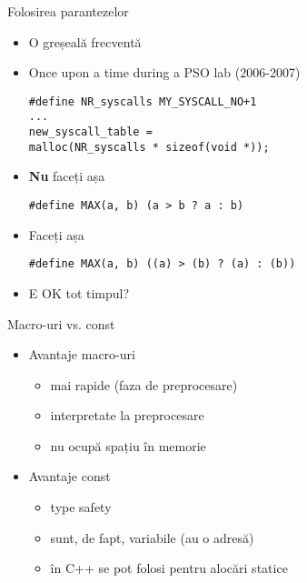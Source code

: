 \documentclass{beamer}
\begin{document}
\begin{frame}{Folosirea parantezelor}
	\begin{itemize}
		\pause \item O greșeală frecventă
		\pause \item Once upon a time during a PSO lab (2006-2007)
			\begin{beamerboxesrounded}[lower=block body,shadow=true]{}
				\texttt{\#define NR\_syscalls     MY\_SYSCALL\_NO+1 \\
			... \\
				new\_syscall\_table = \\
\hlstd{}\hlstd{\ \ \ \ \ \ \ \ }\hlstd{}malloc(NR\_syscalls * sizeof(void *));
		}
			\end{beamerboxesrounded}
		\pause \item \textbf{Nu} faceți așa
			\begin{beamerboxesrounded}[lower=block body,shadow=true]{}
				\texttt{\#define MAX(a, b)   (a > b ? a : b)}
			\end{beamerboxesrounded}
		\pause \item Faceți așa
			\begin{beamerboxesrounded}[lower=block body,shadow=true]{}
				\texttt{\#define MAX(a, b)   ((a) > (b) ? (a) : (b))}
			\end{beamerboxesrounded}
		\pause \item E OK tot timpul?
	\end{itemize}
\end{frame}

\begin{frame}{Macro-uri vs. const}
	\begin{itemize}
		\pause \item Avantaje macro-uri
			\begin{itemize}
				\pause \item mai rapide (faza de preprocesare)
				\pause \item interpretate la preprocesare
				\pause \item nu ocupă spațiu în memorie
			\end{itemize}
		\pause \item Avantaje const
			\begin{itemize}
				\pause \item type safety
				\pause \item sunt, de fapt, variabile (au o adresă)
				\pause \item în C++ se pot folosi pentru alocări statice
			\end{itemize}
	\end{itemize}
\end{frame}
\end{document}
